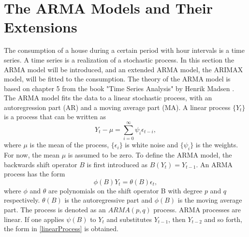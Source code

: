 \section{The ARMA Models and Their Extensions}
The consumption of a house during a certain period with hour intervals is a time series. A time series is a realization of a stochastic process. In this section the ARMA model will be introduced, and an extended ARMA model, the ARIMAX model, will be fitted to the consumption. The theory of the ARMA model is based on chapter 5 from the book "Time Series Analysis" by Henrik Madsen \cite{Time_Series_Analysis}. The ARMA model fits the data to a linear stochastic process, with an autoregression part (AR) and a moving average part (MA). A linear process $\{Y_t\}$ is a process that can be written as
\begin{equation}
    Y_t - \mu = \sum_{i=0}^{\infty} \psi_i \epsilon_{t-i}, \label{linearProcess}
\end{equation}
where $\mu$ is the mean of the process, $\{\epsilon_i\}$ is white noise and $\{\psi_i\}$ is the weights. For now, the mean $\mu$ is assumed to be zero. To define the ARMA model, the backwards shift operator $B$ is first introduced as $B(Y_t) = Y_{t-1}$. An ARMA process has the form
\begin{equation}
    \phi (B)Y_t = \theta (B) \epsilon_t,
\end{equation}
where $\phi$ and $\theta$ are polynomials on the shift operator B with degree $p$ and $q$ respectively. $\theta(B)$ is the autoregressive part and $\phi(B)$ is the moving average part. The process is denoted as an $ARMA(p,q)$ process. ARMA processes are linear. If one applies $\psi(B)$ to $Y_t$ and substitutes $Y_{t-1}$, then $Y_{t-2}$ and so forth, the form in \cref{linearProcess} is obtained.

